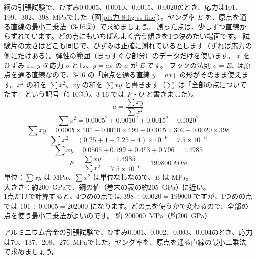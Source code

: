 \begin{phreidai}[試験のデータからヤング率を決める]
\label{ph:力-8:ex2}鋼の引張試験で、ひずみ0.0005、0.0010、0.0015、0.0020のとき、応力は101、199、302、\qty{398}{MPa}でした（図\ref{ph:力-8:fig-ss-line}）。ヤング率 $E$ を、原点を通る直線の最小二乗法（3-16②）で求めましょう。
\phbamen
測った点は、少しずつ直線からずれています。どの点にもいちばんよく合う傾きを1つ決めたい場面です。
\phmushi
試験片の太さはどこも同じで、ひずみは正確に測れているとします（ずれは応力の側にだけある）。弾性の範囲（まっすぐな部分）のデータだけを使います。
\phzu
$x$ をひずみ $\varepsilon$、$y$ を応力 $\sigma$ とし、$y=ax$ の $a$ が $E$ です。
\phriyu
フックの法則 $\sigma=E\varepsilon$ は原点を通る直線なので、3-16 の「原点を通る直線 $y=ax$」の形がそのまま使えます。$x^2$ の和を $\sum x^2$、$xy$ の和を $\sum xy$ と書きます（$\sum$ は「全部の点についてたす」という記号（5-10③）。3-16 では $P$・$Q$ と書きました）。
\[a=\frac{\sum xy}{\sum x^2}\]
\phtateru
\[\textstyle\sum x^2=0.0005^2+0.0010^2+0.0015^2+0.0020^2\]
\[\textstyle\sum xy=0.0005\times101+0.0010\times199+0.0015\times302+0.0020\times398\]
\phtoku
\[\textstyle\sum x^2=(0.25+1+2.25+4)\times10^{-6}=7.5\times10^{-6}\]
\[\textstyle\sum xy=0.0505+0.199+0.453+0.796=1.4985\]
\[E=\frac{\sum xy}{\sum x^2}=\frac{1.4985}{7.5\times10^{-6}}=\qty{199800}{MPa}\]
\phtashikame
単位：$\sum xy$ は MPa、$\sum x^2$ は単位なしなので、$E$ は MPa。\\
大きさ：約\qty{200}{GPa}で、鋼の値（巻末の表の約\qty{205}{GPa}）に近い。\\
1点だけで計算すると、4つめの点では $398\div0.0020=\num{199000}$ ですが、1つめの点では $101\div0.0005=\num{202000}$ になります。どの点を使うかで変わるので、全部の点を使う最小二乗法がよいのです。
\kotae 約 \qty{200000}{MPa}（約\qty{200}{GPa}）
\end{phreidai}
\begin{jibun}
アルミニウム合金の引張試験で、ひずみ0.001、0.002、0.003、0.004のとき、応力は70、137、208、\qty{276}{MPa}でした。ヤング率を、原点を通る直線の最小二乗法で求めましょう。
\end{jibun}


